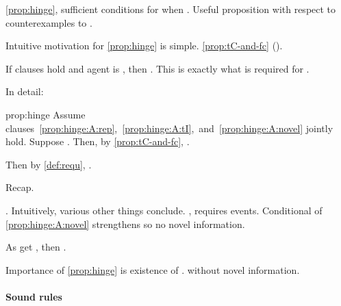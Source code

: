 \begin{note}
  \noindent%
  \autoref{prop:hinge}, sufficient conditions for \requ{} when \tCV{}.
  Useful proposition with respect to counterexamples to \issueConstraint{}.

  Intuitive motivation for \autoref{prop:hinge} is simple.
  \autoref{prop:tC-and-fc} ().

  If clauses hold and agent is \tCV{}, then \fc{}.
  This is exactly what is required for \requ{}.

  In detail:

  \begin{argument}{prop:hinge}
    Assume~ clauses~\ref{prop:hinge:A:rep},~\ref{prop:hinge:A:tI},~and~\ref{prop:hinge:A:novel} jointly hold.
    Suppose \tCV{}.
    Then, by \autoref{prop:tC-and-fc}, \fc{}.

    Then by \autoref{def:requ}, \requ{}.
  \end{argument}

  Recap.

  \tCV{}.
  Intuitively, various other things conclude.
  \tRep{}, requires events.
  Conditional of \autoref{prop:hinge:A:novel} strengthens so no novel information.

  As get \fc{}, then \requ{}.

  Importance of \autoref{prop:hinge} is existence of \requ{}.
  \tCV{} without novel information.
\end{note}

\paragraph*{Sound rules}

